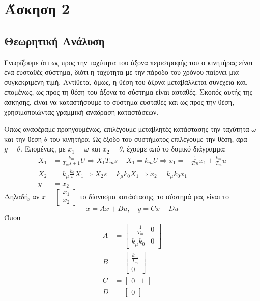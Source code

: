 \section{Άσκηση 2}
\subsection{Θεωρητική Ανάλυση}
Γνωρίζουμε ότι ως προς την ταχύτητα του άξονα περιστροφής του ο κινητήρας είναι ένα ευσταθές σύστημα, διότι η ταχύτητα με την πάροδο του χρόνου παίρνει μια συγκεκριμένη τιμή. Αντίθετα, όμως, η θέση του άξονα μεταβάλλεται συνέχεια και, επομένως, ως προς τη θέση του άξονα το σύστημα είναι ασταθές. Σκοπός αυτής της άσκησης, είναι να καταστήσουμε το σύστημα ευσταθές και ως προς την θέση, χρησιμοποιώντας γραμμική ανάδραση καταστάσεων.

Οπως αναφέραμε προηγουμένως, επιλέγουμε μεταβλητές κατάστασης την ταχύτητα $ω$ και την θέση $θ$ του κινητήρα. Ως έξοδο του συστήματος επιλέγουμε την θέση, άρα \(y=θ\). Επομένως, με $x_1 = ω$ και \(x_2 = θ\), έχουμε από το δομικό διάγραμμα:
\begin{align*}
	X_1 &= \frac{k_m}{T_ms+1}U \Rightarrow X_1T_ms + X_1 = k_mU \Rightarrow \dot{x}_1 = -\frac{1}{Tm}x_1 + \frac{k_m}{T_m}u \\
	X_2 &= k_μ\frac{k_0}{s}X_1 \Rightarrow X_2s = k_μk_0X_1 \Rightarrow \dot{x}_2 = k_μk_0x_1 \\
	y &= x_2
\end{align*}
Δηλαδή, αν $x = \begin{bmatrix} x_1 \\ x_2\end{bmatrix}$ το δίανυσμα κατάστασης, το σύστημά μας είναι το \[\dot{x} = Ax + Bu, \quad y = Cx + Du\]
Όπου
\begin{align*}
	A &= \begin{bmatrix} -\frac{1}{T_m} & 0 \\ k_μk_0 & 0\end{bmatrix} \\
	B &= \begin{bmatrix} \frac{k_m}{T_m} \\ 0 \end{bmatrix} \\
	C &= \begin{bmatrix} 0 & 1\end{bmatrix} \\
	D &= \begin{bmatrix} 0 \end{bmatrix}
\end{align*}
